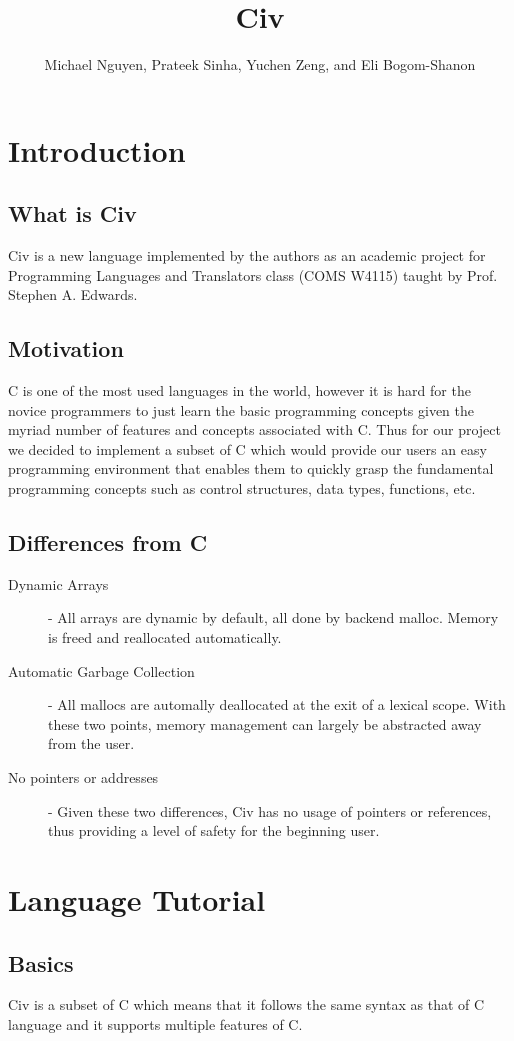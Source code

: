 \documentclass[a4paper]{article}
\author{Michael Nguyen, Prateek Sinha, Yuchen Zeng, and Eli Bogom-Shanon }
\title{Civ}
\begin{document}
\maketitle
\pagebreak
\tableofcontents
\pagebreak
\section{Introduction}
\subsection{What is Civ}
Civ is a new language implemented by the authors as an academic project for Programming Languages and Translators class (COMS W4115) taught by Prof. Stephen A. Edwards.
\subsection{Motivation}
C is one of the most used languages in the world, however it is hard for the novice programmers to just learn the basic programming concepts given the myriad number of features and concepts associated with C. Thus for our project we decided to implement a subset of C which would provide our users an easy programming environment that enables them to quickly grasp the fundamental programming concepts such as control structures, data types, functions, etc.
\subsection{Differences from C}
\begin{description}
    \item[Dynamic Arrays] - All arrays are dynamic by default, all done by backend malloc. Memory is freed and reallocated automatically.
    \item[Automatic Garbage Collection] - All mallocs are automally deallocated at the exit of a lexical scope. With these two points, memory management can largely be abstracted away from the user.
    \item[No pointers or addresses] - Given these two differences, Civ has no usage of pointers or references, thus providing a level of safety for the beginning user.
\end{description}

\section{Language Tutorial}
\subsection{Basics}
Civ is a subset of C which means that it follows the same syntax as that of C language and it supports  multiple features of C. 
\end{document}
